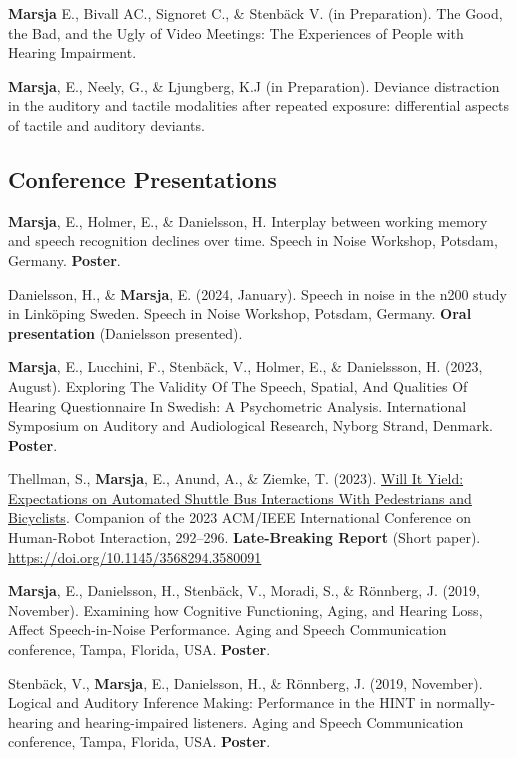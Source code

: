 \documentclass[]{article}
\begin{document}
\textbf{Marsja} E., Bivall AC., Signoret C., \& Stenbäck V. (in
Preparation). The Good, the Bad, and the Ugly of Video Meetings: The
Experiences of People with Hearing Impairment.

\textbf{Marsja}, E., Neely, G., \& Ljungberg, K.J (in Preparation).
Deviance distraction in the auditory and tactile modalities after
repeated exposure: differential aspects of tactile and auditory
deviants.

\subsection{Conference Presentations}\label{conference-presentations}

\textbf{Marsja}, E., Holmer, E., \& Danielsson, H. Interplay between
working memory and speech recognition declines over time. Speech in
Noise Workshop, Potsdam, Germany. \textbf{Poster}.

Danielsson, H., \& \textbf{Marsja}, E. (2024, January). Speech in noise
in the n200 study in Linköping Sweden. Speech in Noise Workshop,
Potsdam, Germany. \textbf{Oral presentation} (Danielsson presented).

\textbf{Marsja}, E., Lucchini, F., Stenbäck, V., Holmer, E., \&
Danielssson, H. (2023, August). Exploring The Validity Of The Speech,
Spatial, And Qualities Of Hearing Questionnaire In Swedish: A
Psychometric Analysis. International Symposium on Auditory and
Audiological Research, Nyborg Strand, Denmark. \textbf{Poster}.

Thellman, S., \textbf{Marsja}, E., Anund, A., \& Ziemke, T. (2023).
\href{https://dl.acm.org/doi/10.1145/3568294.3580091}{Will It Yield:
Expectations on Automated Shuttle Bus Interactions With Pedestrians and
Bicyclists}. Companion of the 2023 ACM/IEEE International Conference on
Human-Robot Interaction, 292--296. \textbf{Late-Breaking Report} (Short
paper). \url{https://doi.org/10.1145/3568294.3580091}

\textbf{Marsja}, E., Danielsson, H., Stenbäck, V., Moradi, S., \&
Rönnberg, J. (2019, November). Examining how Cognitive Functioning,
Aging, and Hearing Loss, Affect Speech-in-Noise Performance. Aging and
Speech Communication conference, Tampa, Florida, USA. \textbf{Poster}.

Stenbäck, V., \textbf{Marsja}, E., Danielsson, H., \& Rönnberg, J.
(2019, November). Logical and Auditory Inference Making: Performance in
the HINT in normally-hearing and hearing-impaired listeners. Aging and
Speech Communication conference, Tampa, Florida, USA. \textbf{Poster}.
\end{document}
